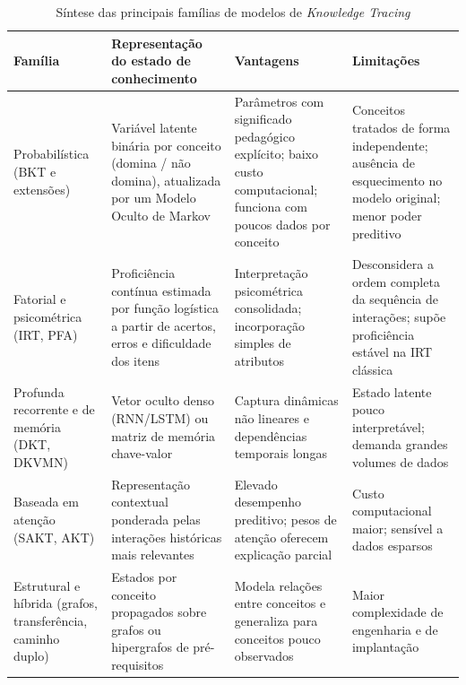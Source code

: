 \begin{table}[H]
\caption{Síntese das principais famílias de modelos de \textit{Knowledge Tracing}}
\label{tab:familias-kt}
\centering
\small
\begin{tabularx}{\textwidth}{>{\raggedright\arraybackslash}p{2.6cm}>{\raggedright\arraybackslash}X>{\raggedright\arraybackslash}X>{\raggedright\arraybackslash}X}
\hline
\textbf{Família} & \textbf{Representação do estado de conhecimento} & \textbf{Vantagens} & \textbf{Limitações} \\
\hline
Probabilística (BKT e extensões) \cite{corbett_knowledge_1994, pardos_kt-idem_2011} & Variável latente binária por conceito (domina / não domina), atualizada por um Modelo Oculto de Markov & Parâmetros com significado pedagógico explícito; baixo custo computacional; funciona com poucos dados por conceito & Conceitos tratados de forma independente; ausência de esquecimento no modelo original; menor poder preditivo \\
\hline
Fatorial e psicométrica (IRT, PFA) \cite{embretson_item_2013, pavlik_performance_2009} & Proficiência contínua estimada por função logística a partir de acertos, erros e dificuldade dos itens & Interpretação psicométrica consolidada; incorporação simples de atributos & Desconsidera a ordem completa da sequência de interações; supõe proficiência estável na IRT clássica \\
\hline
Profunda recorrente e de memória (DKT, DKVMN) \cite{piech_deep_2015, zhang_dynamic_2017} & Vetor oculto denso (RNN/LSTM) ou matriz de memória chave-valor & Captura dinâmicas não lineares e dependências temporais longas & Estado latente pouco interpretável; demanda grandes volumes de dados \\
\hline
Baseada em atenção (SAKT, AKT) \cite{pandey_self-attentive_2019, ghosh_context-aware_2020} & Representação contextual ponderada pelas interações históricas mais relevantes & Elevado desempenho preditivo; pesos de atenção oferecem explicação parcial & Custo computacional maior; sensível a dados esparsos \\
\hline
Estrutural e híbrida (grafos, transferência, caminho duplo) \cite{liu_enhancing_2026, liao_naviedu_2026} & Estados por conceito propagados sobre grafos ou hipergrafos de pré-requisitos & Modela relações entre conceitos e generaliza para conceitos pouco observados & Maior complexidade de engenharia e de implantação \\
\hline
\end{tabularx}
\end{table}
